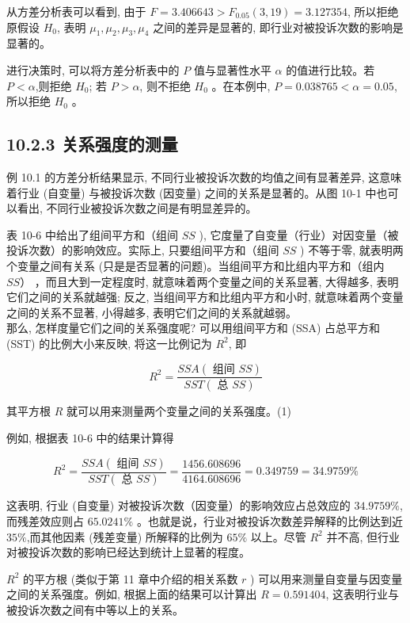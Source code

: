 \documentclass[10pt]{article}
\begin{document}
\begin{CJK*}{UTF8}{bsmi}
从方差分析表可以看到, 由于 $F=3.406643>F_{0.05}(3,19)=3.127354$, 所以拒绝原假设 $H_{0}$, 表明 $\mu_{1}, \mu_{2}, \mu_{3}, \mu_{4}$ 之间的差异是显著的, 即行业对被投诉次数的影响是显著的。

进行决策时, 可以将方差分析表中的 $P$ 值与显著性水平 $\alpha$ 的值进行比较。若 $P<\alpha$,则拒绝 $H_{0}$; 若 $P>\alpha$, 则不拒绝 $H_{0}$ 。在本例中, $P=0.038765<\alpha=0.05$, 所以拒绝 $H_{0}$ 。

\subsection*{10.2.3 关系强度的测量}
例 10.1 的方差分析结果显示, 不同行业被投诉次数的均值之间有显著差异, 这意味着行业 (自变量) 与被投诉次数 (因变量) 之间的关系是显著的。从图 10-1 中也可以看出, 不同行业被投诉次数之间是有明显差异的。

表 10-6 中给出了组间平方和（组间 $S S$ ), 它度量了自变量（行业）对因变量（被投诉次数）的影响效应。实际上, 只要组间平方和（组间 $S S$ ) 不等于零, 就表明两个变量之间有关系 (只是是否显著的问题)。当组间平方和比组内平方和（组内 $S S ）$ ，而且大到一定程度时, 就意味着两个变量之间的关系显著, 大得越多, 表明它们之间的关系就越强; 反之, 当组间平方和比组内平方和小时, 就意味着两个变量之间的关系不显著, 小得越多, 表明它们之间的关系就越弱。\\
那么, 怎样度量它们之间的关系强度呢? 可以用组间平方和 (SSA) 占总平方和 (SST) 的比例大小来反映, 将这一比例记为 $R^{2}$, 即


\begin{equation*}
R^{2}=\frac{S S A(\text { 组间 } S S)}{S S T(\text { 总 } S S)} \tag{10.10}
\end{equation*}


其平方根 $R$ 就可以用来测量两个变量之间的关系强度。(1)

例如, 根据表 10-6 中的结果计算得

$$
R^{2}=\frac{S S A(\text { 组间 } S S)}{S S T(\text { 总 } S S)}=\frac{1456.608696}{4164.608696}=0.349759=34.9759 \%
$$

这表明, 行业 (自变量) 对被投诉次数（因变量）的影响效应占总效应的 $34.9759 \%$,而残差效应则占 $65.0241 \%$ 。也就是说，行业对被投诉次数差异解释的比例达到近 $35 \%$,而其他因素 (残差变量) 所解释的比例为 $65 \%$ 以上。尽管 $R^{2}$ 并不高, 但行业对被投诉次数的影响已经达到统计上显著的程度。

$R^{2}$ 的平方根 (类似于第 11 章中介绍的相关系数 $r$ ) 可以用来测量自变量与因变量之间的关系强度。例如, 根据上面的结果可以计算出 $R=0.591404$, 这表明行业与被投诉次数之间有中等以上的关系。


\end{CJK*}
\end{document}
